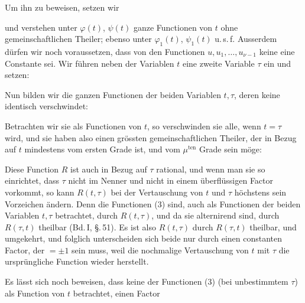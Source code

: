 
Um ihn zu beweisen, setzen wir


und verstehen unter $\varphi(t)$, $\psi(t)$ ganze Functionen von $t$
ohne gemeinschaftlichen Theiler; ebenso unter $\varphi_1(t)$,
$\psi_1(t)$ u.\,s.\,f. Ausserdem dürfen wir noch voraussetzen, dass
von den Functionen $u, u_1, \ldots, u_{\nu-1}$ keine eine Constante sei.
Wir führen neben der Variablen $t$ eine zweite Variable $\tau$ ein und
setzen:


Nun bilden wir die ganzen Functionen der beiden Variablen $t, \tau$,
deren keine identisch verschwindet:


Betrachten wir sie als Functionen von $t$, so verschwinden sie alle,
wenn $t = \tau$ wird, und sie haben also einen grössten
gemeinschaftlichen Theiler, der in Bezug auf $t$ mindestens vom
ersten Grade ist, und vom $\mu^{\text{ten}}$ Grade sein möge:


Diese Function $R$ ist auch in Bezug auf $\tau$ rational, und wenn
man sie so einrichtet, dass $\tau$ nicht im Nenner und nicht in einem
überflüssigen Factor vorkommt, so kann $R(t, \tau)$ bei der
Vertauschung von $t$ und $\tau$ höchstens sein Vorzeichen ändern.
Denn die Functionen (3) sind, auch als Functionen der beiden
Variablen $t, \tau$ betrachtet, durch $R(t, \tau)$, und da sie
alternirend sind, durch $R(\tau, t)$ theilbar (Bd.\,I, \S.\,51). Es
ist also $R(t, \tau)$ durch $R(\tau, t)$ theilbar, und umgekehrt, und
folglich unterscheiden sich beide nur durch einen constanten Factor,
der $= \pm 1$ sein muss, weil die nochmalige Vertauschung von $t$ mit
$\tau$ die ursprüngliche Function wieder herstellt.

Es lässt sich noch beweisen, dass keine der Functionen (3) (bei
unbestimmtem $\tau$) als Function von $t$ betrachtet, einen Factor
